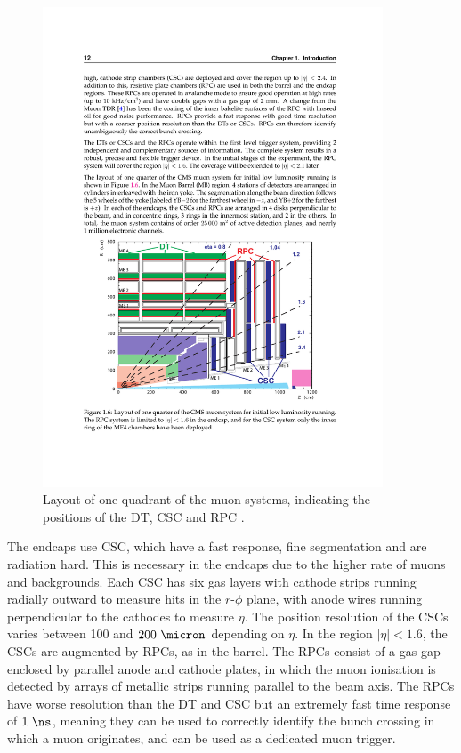 \begin{figure}[htbp]
   \includegraphics[width=0.9\textwidth]{plots/detector/muon_layout.pdf}
\caption[Layout of one quadrant of the muon systems.]{
    Layout of one quadrant of the muon systems, indicating the positions
of the DT, CSC and RPC \cite{TDR}.}
\label{fig:muondetectors}
\end{figure}

The endcaps use \ac{CSC}, which have a fast response, fine segmentation and are
radiation hard. This is necessary in the endcaps due to the higher rate of muons
and backgrounds. Each \ac{CSC} has six gas layers with cathode strips running
radially outward to measure hits in the $r$-$\phi$ plane, with anode wires
running perpendicular to the cathodes to measure $\eta$. The position resolution
of the \ac{CSC}s varies between 100 and $200~\micron$ depending on $\eta$. In the region
$|\eta|<1.6$, the \ac{CSC}s are augmented by \ac{RPC}s, as in the barrel. The
\ac{RPC}s consist of a gas gap enclosed by parallel anode and cathode plates, in
which the muon ionisation is detected by arrays of metallic strips running
parallel to the beam axis. The \ac{RPC}s have worse resolution than the \ac{DT}
and \ac{CSC} but an extremely fast time response of
$1~\ns$, meaning they can be used to correctly identify the bunch crossing in
which a muon originates, and can be used as a dedicated muon trigger.


